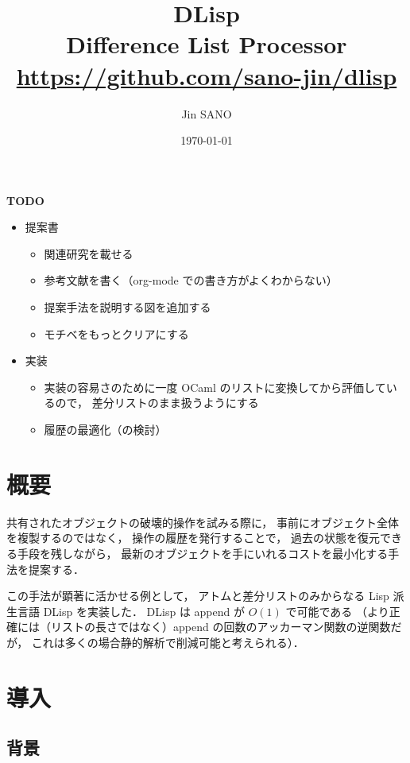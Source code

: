 \documentclass[10pt, a4j, twocolumn]{scrartcl}
\author{Jin SANO}
\date{\today}
\title{DLisp\\\medskip
\large Difference List Processor \\ \url{https://github.com/sano-jin/dlisp}}
\begin{document}
\maketitle
\tableofcontents

\vspace{1em}

\textbf{\textbf{TODO}} 

\begin{itemize}
\item 提案書
\begin{itemize}
\item 関連研究を載せる
\item 参考文献を書く（org-mode での書き方がよくわからない）
\item 提案手法を説明する図を追加する
\item モチベをもっとクリアにする
\end{itemize}

\item 実装
\begin{itemize}
\item 実装の容易さのために一度 OCaml のリストに変換してから評価しているので，
差分リストのまま扱うようにする
\item 履歴の最適化（の検討）
\end{itemize}
\end{itemize}


\section{概要}
\label{sec:org870d4a1}

共有されたオブジェクトの破壊的操作を試みる際に，
事前にオブジェクト全体を複製するのではなく，
操作の履歴を発行することで，
過去の状態を復元できる手段を残しながら，
最新のオブジェクトを手にいれるコストを最小化する手法を提案する．

この手法が顕著に活かせる例として，
アトムと差分リストのみからなる Lisp 派生言語 DLisp を実装した．
DLisp は append が \(O(1)\) で可能である
（より正確には（リストの長さではなく）append の回数のアッカーマン関数の逆関数だが，
これは多くの場合静的解析で削減可能と考えられる）．


\section{導入}
\label{sec:orgc9aee2e}

\subsection{背景}
\label{sec:orgcf22e67}
\end{document}
